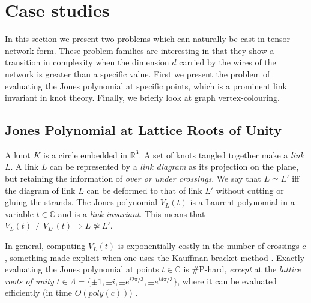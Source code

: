 \section{Case studies}

In this section we present two problems which can naturally be cast in tensor-network form.
These problem families are interesting in that they show a transition in complexity when the dimension $d$ carried by the wires of the network is greater than a specific value.
First we present the problem of evaluating the Jones polynomial at specific points, which is a prominent link invariant in knot theory.
Finally, we briefly look at graph vertex-colouring.

\subsection{Jones Polynomial at Lattice Roots of Unity}


A knot $K$ is a circle embedded in $\mathbb{R}^3$.
A set of knots tangled together make a \emph{link} $L$.
A link $L$ can be represented by a \emph{link diagram}
as its projection on the plane,
but retaining the information of \emph{over or under crossings}.
We say that $L\simeq L'$ iff the diagram of link $L$ can be deformed to that of link $L'$ without cutting or gluing the strands.
The Jones polynomial $V_L(t)$
is a Laurent polynomial in a variable $t\in\mathbb{C}$
and is a \emph{link invariant}.
This means that
$V_L(t)\neq V_{L'}(t)\Rightarrow L\not\simeq L'$.

In general, computing $V_L(t)$
is exponentially costly in the number of crossings $c$,
something made explicit when one uses the Kauffman bracket method \cite{Kauffman2001}.
Exactly evaluating the Jones polynomial at points $t\in\mathbb{C}$ is \#P-hard,
\emph{except} at the \emph{lattice roots of unity} $t\in\Lambda = \{ \pm 1, \pm i, \pm e^{i 2\pi/3}, \pm e^{i 4\pi/3} \}$,
where it can be evaluated efficiently (in time $O(poly(c))$) \cite{jaeger_vertigan_welsh_1990}.


